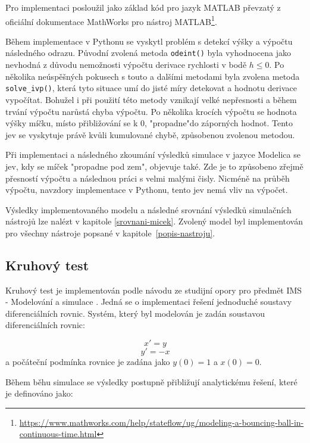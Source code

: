 Pro implementaci posloužil jako základ kód pro jazyk MATLAB převzatý z oficiální dokumentace MathWorks pro nástroj MATLAB\footnote{\url{https://www.mathworks.com/help/stateflow/ug/modeling-a-bouncing-ball-in-continuous-time.html}}.

Během implementace v Pythonu se vyskytl problém s detekcí výšky a výpočtu následného odrazu. Původní zvolená metoda \texttt{odeint()} byla vyhodnocena jako nevhodná z důvodu nemožnosti výpočtu derivace rychlosti v bodě $h\leq0$. Po několika neúspěšných pokusech s touto a dalšími metodami byla zvolena metoda \texttt{solve\_ivp()}, která tyto situace umí do jisté míry detekovat a hodnotu derivace vypočítat. Bohužel i při použití této metody vznikají velké nepřesnosti a během trvání výpočtu narůstá chyba výpočtu. Po několika krocích výpočtu se hodnota výšky míčku, místo přibližování se k 0, "propadne"\space do záporných hodnot. Tento jev se vyskytuje právě kvůli kumulované chybě, způsobenou zvolenou metodou.

Při implementaci a následného zkoumání výsledků simulace v jazyce Modelica se jev, kdy se míček "propadne pod zem", objevuje také. Zde je to způsobeno zřejmě přesností výpočtu a následnou práci s velmi malými čisly. Nicméně na průběh výpočtu, navzdory implementace v Pythonu, tento jev nemá vliv na výpočet.

Výsledky implementovaného modelu a následné srovnání výsledků simulačních nástrojů lze nalézt v kapitole \ref{srovnani-micek}.
Zvolený model byl implementován pro všechny nástroje popsané v kapitole~\ref{popis-nastroju}.

\subsection{Kruhový test}
\label{kruhovy-test}

Kruhový test je implementován podle návodu ze studijní opory pro předmět IMS - Modelování a simulace \cite{IMS-skripta}. Jedná se o implementaci řešení jednoduché soustavy diferenciálních rovnic. Systém, který byl modelován je zadán soustavou diferenciálních rovnic:

\begin{equation}
   x' = y
\end{equation}
\begin{equation}
    y' = -x
\end{equation}
a počáteční podmínka rovnice je zadána jako $y(0) = 1$ a $x(0) = 0$.

Během běhu simulace se výsledky postupně přibližují analytickému řešení, které je definováno jako:

